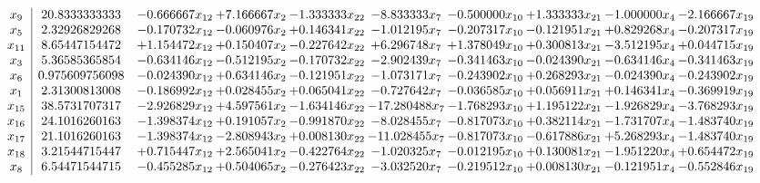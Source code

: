 \documentclass[10pt]{article}
\begin{document}
 \[\begin{array}{c| c c@{\hskip 2pt} c@{\hskip 2pt} c@{\hskip 2pt} c@{\hskip 2pt} c@{\hskip 2pt} c@{\hskip 2pt} c@{\hskip 2pt} c@{\hskip 2pt} }
 x_{9}   &  20.8333333333 & -0.666667 x_{12} & + 7.166667 x_{2} & -1.333333 x_{22} & -8.833333 x_{7} & -0.500000 x_{10} & + 1.333333 x_{21} & -1.000000 x_{4} & -2.166667 x_{19}\\
 x_{5}   &  2.32926829268 & -0.170732 x_{12} & -0.060976 x_{2} & + 0.146341 x_{22} & -1.012195 x_{7} & -0.207317 x_{10} & -0.121951 x_{21} & + 0.829268 x_{4} & -0.207317 x_{19}\\
 x_{11}   &  8.65447154472 & + 1.154472 x_{12} & + 0.150407 x_{2} & -0.227642 x_{22} & + 6.296748 x_{7} & + 1.378049 x_{10} & + 0.300813 x_{21} & -3.512195 x_{4} & + 0.044715 x_{19}\\
 x_{3}   &  5.36585365854 & -0.634146 x_{12} & -0.512195 x_{2} & -0.170732 x_{22} & -2.902439 x_{7} & -0.341463 x_{10} & -0.024390 x_{21} & -0.634146 x_{4} & -0.341463 x_{19}\\
 x_{6}   &  0.975609756098 & -0.024390 x_{12} & + 0.634146 x_{2} & -0.121951 x_{22} & -1.073171 x_{7} & -0.243902 x_{10} & + 0.268293 x_{21} & -0.024390 x_{4} & -0.243902 x_{19}\\
 x_{1}   &  2.31300813008 & -0.186992 x_{12} & + 0.028455 x_{2} & + 0.065041 x_{22} & -0.727642 x_{7} & -0.036585 x_{10} & + 0.056911 x_{21} & + 0.146341 x_{4} & -0.369919 x_{19}\\
 x_{15}   &  38.5731707317 & -2.926829 x_{12} & + 4.597561 x_{2} & -1.634146 x_{22} & -17.280488 x_{7} & -1.768293 x_{10} & + 1.195122 x_{21} & -1.926829 x_{4} & -3.768293 x_{19}\\
 x_{16}   &  24.1016260163 & -1.398374 x_{12} & + 0.191057 x_{2} & -0.991870 x_{22} & -8.028455 x_{7} & -0.817073 x_{10} & + 0.382114 x_{21} & -1.731707 x_{4} & -1.483740 x_{19}\\
 x_{17}   &  21.1016260163 & -1.398374 x_{12} & -2.808943 x_{2} & + 0.008130 x_{22} & -11.028455 x_{7} & -0.817073 x_{10} & -0.617886 x_{21} & + 5.268293 x_{4} & -1.483740 x_{19}\\
 x_{18}   &  3.21544715447 & + 0.715447 x_{12} & + 2.565041 x_{2} & -0.422764 x_{22} & -1.020325 x_{7} & -0.012195 x_{10} & + 0.130081 x_{21} & -1.951220 x_{4} & + 0.654472 x_{19}\\
 x_{8}   &  6.54471544715 & -0.455285 x_{12} & + 0.504065 x_{2} & -0.276423 x_{22} & -3.032520 x_{7} & -0.219512 x_{10} & + 0.008130 x_{21} & -0.121951 x_{4} & -0.552846 x_{19}\\

\end{array}\]
\end{document}

